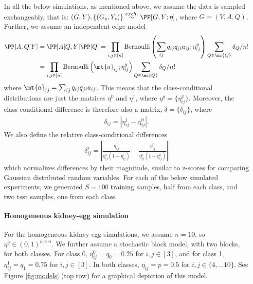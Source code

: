 In all the below simulations, as mentioned above, we assume the data is sampled exchangeably, that is: $(G,Y), \{(G_s,Y_s)\} \overset{exch.}{\sim} \PP[G,Y; \eta]$, where $G=(V,A,Q)$.  Further, we assume an independent edge model
\begin{align}
\PP[A,Q | Y] &= \PP[A|Q,Y] \PP[Q] = \prod_{i,j \in [n]} \text{Bernoulli}\left(\sum_{ij} q_{ij} q_{ji} a_{ij}; \eta_{ij}^y\right) \sum_{Q\in \mc{Q}} \delta_Q/n! \\
&=  \prod_{i,j \in [n]} \text{Bernoulli}\left(\mt{a}_{ij}; \eta_{ij}^y\right) \sum_{Q\in \mc{Q}} \delta_Q/n!
\end{align}
where $\mt{a}_{ij} = \sum_{ij} q_{ij} q_{ji} a_{ij}$.  This means that the class-conditional distributions are just the matrices $\eta^0$ and $\eta^1$, where $\eta^y=\{\eta_{ij}^y\}$. Moreover, the class-conditional difference is therefore also a matrix, $\delta=\{\delta_{ij}\}$, where
\begin{align}
	\delta_{ij} = | \eta_{ij}^1-\eta_{ij}^0|.
\end{align}
We also define the relative class-conditional differences
\begin{align}
	\delta_{ij}^r = \left| \frac{\eta_{ij}^1}{\eta_{ij}^1 (1-\eta_{ij}^1)} - \frac{\eta_{ij}^0}{\eta_{ij}^0 (1-\eta_{ij}^0)} \right|
\end{align}
which normalizes differences by their magnitude, similar to z-scores for comparing Gaussian distributed random variables. For each of the below simulated experiments, we generated $S=100$ training samples, half from each class, and two test samples, one from each class.  



\paragraph{Homogeneous kidney-egg simulation} %
\label{par:homogeneous_kidney_egg_simulation}

For the homogeneous kidney-egg simulations, we assume $n=10$, so $\eta^y \in (0,1)^{n\times n}$.  We further assume a stochastic block model, with two blocks, for both classes.  For class 0, $\eta_{ij}^0=q_0=0.25$ for $i,j \in [3]$, and for class 1, $\eta_{ij}^1=q_1=0.75$ for $i,j \in [3]$.  In both classes, $\eta_{ij}=p=0.5$ for $i,j \in \{4,\ldots 10\}$.  See Figure \ref{fig:models} (top row) for a graphical depiction of this model.  



